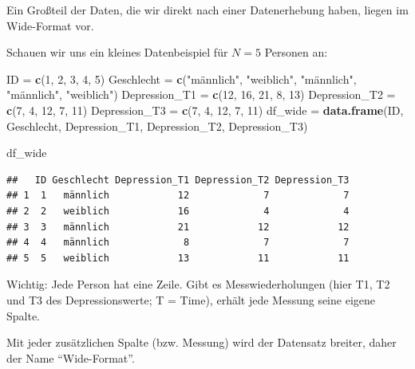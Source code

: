 \documentclass[
]{book}
\newenvironment{Shaded}{\begin{snugshade}}{\end{snugshade}}
\newcommand{\DecValTok}[1]{\textcolor[rgb]{0.00,0.00,0.81}{#1}}
\newcommand{\FunctionTok}[1]{\textcolor[rgb]{0.13,0.29,0.53}{\textbf{#1}}}
\newcommand{\NormalTok}[1]{#1}
\newcommand{\OtherTok}[1]{\textcolor[rgb]{0.56,0.35,0.01}{#1}}
\newcommand{\StringTok}[1]{\textcolor[rgb]{0.31,0.60,0.02}{#1}}
\begin{document}
Ein Großteil der Daten, die wir direkt nach einer Datenerhebung haben, liegen im Wide-Format vor.

Schauen wir uns ein kleines Datenbeispiel für \(N=5\) Personen an:

\begin{Shaded}
\begin{Highlighting}[]
\NormalTok{ID }\OtherTok{=} \FunctionTok{c}\NormalTok{(}\DecValTok{1}\NormalTok{, }\DecValTok{2}\NormalTok{, }\DecValTok{3}\NormalTok{, }\DecValTok{4}\NormalTok{, }\DecValTok{5}\NormalTok{)}
\NormalTok{Geschlecht }\OtherTok{=} \FunctionTok{c}\NormalTok{(}\StringTok{"männlich"}\NormalTok{, }\StringTok{"weiblich"}\NormalTok{, }\StringTok{"männlich"}\NormalTok{, }\StringTok{"männlich"}\NormalTok{, }\StringTok{"weiblich"}\NormalTok{)}
\NormalTok{Depression\_T1 }\OtherTok{=} \FunctionTok{c}\NormalTok{(}\DecValTok{12}\NormalTok{, }\DecValTok{16}\NormalTok{, }\DecValTok{21}\NormalTok{, }\DecValTok{8}\NormalTok{, }\DecValTok{13}\NormalTok{)}
\NormalTok{Depression\_T2 }\OtherTok{=} \FunctionTok{c}\NormalTok{(}\DecValTok{7}\NormalTok{, }\DecValTok{4}\NormalTok{, }\DecValTok{12}\NormalTok{, }\DecValTok{7}\NormalTok{, }\DecValTok{11}\NormalTok{)}
\NormalTok{Depression\_T3 }\OtherTok{=} \FunctionTok{c}\NormalTok{(}\DecValTok{7}\NormalTok{, }\DecValTok{4}\NormalTok{, }\DecValTok{12}\NormalTok{, }\DecValTok{7}\NormalTok{, }\DecValTok{11}\NormalTok{)}
\NormalTok{df\_wide }\OtherTok{=} \FunctionTok{data.frame}\NormalTok{(ID, Geschlecht, Depression\_T1, Depression\_T2, Depression\_T3)}

\NormalTok{df\_wide}
\end{Highlighting}
\end{Shaded}

\begin{verbatim}
##   ID Geschlecht Depression_T1 Depression_T2 Depression_T3
## 1  1   männlich            12             7             7
## 2  2   weiblich            16             4             4
## 3  3   männlich            21            12            12
## 4  4   männlich             8             7             7
## 5  5   weiblich            13            11            11
\end{verbatim}

Wichtig: Jede Person hat eine Zeile. Gibt es Messwiederholungen (hier T1, T2 und T3 des Depressionswerte; T = Time), erhält jede Messung seine eigene Spalte.

Mit jeder zusätzlichen Spalte (bzw. Messung) wird der Datensatz breiter, daher der Name ``Wide-Format''.
\end{document}
